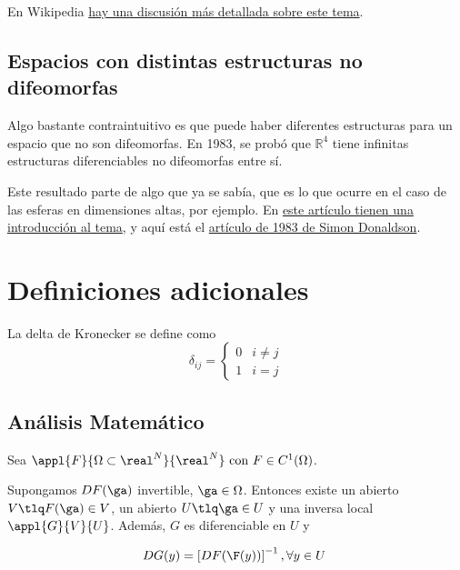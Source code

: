 \documentclass{apuntes}
\begin{document}
En Wikipedia \href{http://en.wikipedia.org/wiki/Non-analytic_smooth_function}{hay una discusión más detallada sobre este tema}.

\section{Espacios con distintas estructuras no difeomorfas}
\label{secMismoEspacioNoDifeomorfo}

Algo bastante contraintuitivo es que puede haber diferentes estructuras para un espacio que no son difeomorfas. En 1983, se probó que $ℝ^4$ tiene infinitas estructuras diferenciables no difeomorfas entre sí.

Este resultado parte de algo que ya se sabía, que es lo que ocurre en el caso de las esferas en dimensiones altas, por ejemplo. En \href{http://plus.maths.org/content/richard-elwes}{este artículo tienen una introducción al tema}, y aquí está el \href{http://projecteuclid.org/euclid.bams/1183550021}{artículo de 1983 de Simon Donaldson}.

\chapter{Definiciones adicionales}

\begin{defn} \label{defDeltaKronecker} La delta de Kronecker se define como \[ δ_{ij} = \begin{cases} 0 & i ≠ j \\ 1 & i = j \end{cases} \] \end{defn}

\section{Análisis Matemático}

\begin{theorem}  \label{thmInv} Sea $\appl{F}{\Omega\subset\real^N}{\real^N} \text{ con } F\in C^1(\Omega)$.

Supongamos $DF(\ga)$ invertible, $\ga \in \Omega$. Entonces existe un abierto $V \tlq F(\ga)\in V$, un abierto $U \tlq \ga \in U$ y una inversa local $\appl{G}{V}{U}$. Además, $G$ es diferenciable en $U$ y

\[ DG(y) = \left[DF(\F(y))\right]^{-1}, \forall y \in U \]
\end{theorem}
\end{document}
